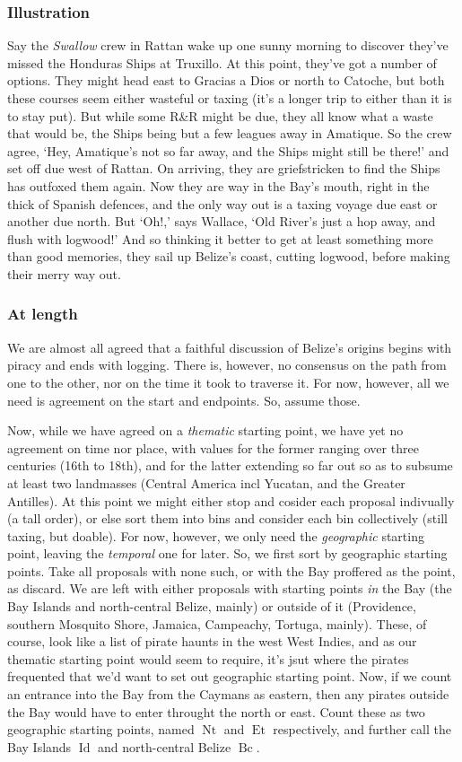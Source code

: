 \documentclass{amsart}
\newcommand{\titleit}[1]{\textit{#1}}%
\DeclareMathOperator{\id}{Id}%
\DeclareMathOperator{\bc}{Bc}%
\DeclareMathOperator{\et}{Et}%
\DeclareMathOperator{\nt}{Nt}%
\theoremstyle{definition}%
\theoremstyle{definition}%
\theoremstyle{remark}%
\begin{document}
\subsubsection{Illustration}%
\label{sss:illustration}
Say the \titleit{Swallow} crew in Rattan wake up one sunny morning to discover they've missed the Honduras Ships at Truxillo. At this point, they've got a number of options. They might head east to Gracias a Dios or north to Catoche, but both these courses seem either wasteful or taxing (it's a longer trip to either than it is to stay put). But while some R\&R might be due, they all know what a waste that would be, the Ships being but a few leagues away in Amatique. So the crew agree, `Hey, Amatique's not so far away, and the Ships might still be there!' and set off due west of Rattan. On arriving, they are griefstricken to find the Ships has outfoxed them again. Now they are way in the Bay's mouth, right in the thick of Spanish defences, and the only way out is a taxing voyage due east or another due north. But `Oh!,' says Wallace, `Old River's just a hop away, and flush with logwood!' And so thinking it better to get at least something more than good memories, they sail up Belize's coast, cutting logwood, before making their merry way out.
\subsubsection{At length} We are almost all agreed that a faithful discussion of Belize's origins begins with piracy and ends with logging. There is, however, no consensus on the path from one to the other, nor on the time it took to traverse it. For now, however, all we need is agreement on the start and endpoints. So, assume those.

Now, while we have agreed on a \emph{thematic} starting point, we have yet no agreement on time nor place, with values for the former ranging over three centuries (16th to 18th), and for the latter extending so far out so as to subsume at least two landmasses (Central America incl Yucatan, and the Greater Antilles). At this point we might either stop and cosider each proposal indivually (a tall order), or else sort them into bins and consider each bin collectively (still taxing, but doable). For now, however, we only need the \emph{geographic} starting point, leaving the \emph{temporal} one for later. So, we first sort by geographic starting points. Take all proposals with none such, or with the Bay proffered as the point, as discard. We are left with either proposals with starting points \emph{in} the Bay (the Bay Islands and north-central Belize, mainly) or outside of it (Providence, southern Mosquito Shore, Jamaica, Campeachy, Tortuga, mainly). These, of course, look like a list of pirate haunts in the west West Indies, and as our thematic starting point would seem to require, it's jsut where the pirates frequented that we'd want to set out geographic starting point. Now, if we count an entrance into the Bay from the Caymans as eastern, then any pirates outside the Bay would have to enter throught the north or east. Count these as two geographic starting points, named \(\nt\) and \(\et\) respectively, and further call the Bay Islands \(\id\) and north-central Belize \(\bc\).
\end{document}
